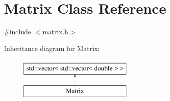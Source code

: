 \hypertarget{classMatrix}{}\section{Matrix Class Reference}
\label{classMatrix}


{\ttfamily \#include $<$matrix.\+h$>$}

Inheritance diagram for Matrix\+:\begin{figure}[H]
\begin{center}
\leavevmode
\includegraphics[height=2.000000cm]{classMatrix}
\end{center}
\end{figure}
